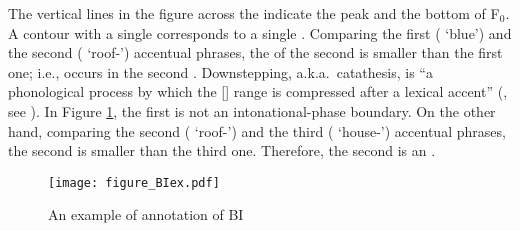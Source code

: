 The vertical lines in the figure across the  indicate
the peak and the bottom of F$_{0}$.
A contour with a single  corresponds to a single .
Comparing the first ( `blue') and the second ( `roof-') accentual phrases,
the  of the second is smaller than the first one;
i.e.,  occurs in the second .
Downstepping, a.k.a.~catathesis, is ``a phonological process by which the [] range is compressed after a lexical accent'' (, see ).
In Figure \ref{BIexF}, the first  is not an intonational-phase boundary.
On the other hand,
comparing the second ( `roof-') and the third ( `house-') accentual phrases,
the second  is smaller than the third one.
Therefore,
the second  is an .

\begin{figure}
 \centering
 \texttt{[image: figure\_BIex.pdf]}
 \caption{An example of annotation of BI \cite[][412]{igarashietal06}}
 \label{BIexF}
\end{figure}


